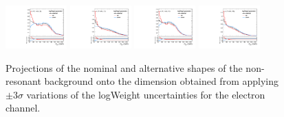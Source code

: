 \begin{figure}[htbp]
  \centering
  \includegraphics[width=0.21\textwidth]{fig/analysisAppendix/systs_nonRes_e_HP_nobb_LDy_logWeight_ProjY.pdf}
  \includegraphics[width=0.21\textwidth]{fig/analysisAppendix/systs_nonRes_e_LP_nobb_LDy_logWeight_ProjY.pdf}
  \includegraphics[width=0.21\textwidth]{fig/analysisAppendix/systs_nonRes_e_HP_nobb_HDy_logWeight_ProjY.pdf}
  \includegraphics[width=0.21\textwidth]{fig/analysisAppendix/systs_nonRes_e_LP_nobb_HDy_logWeight_ProjY.pdf}\\
  \caption{
    Projections of the nominal and alternative shapes of the non-resonant background onto the \MJ dimension obtained from applying $\pm3\sigma$ variations of the logWeight uncertainties for the electron channel.
  }
  \label{fig:systNonResMJ_logWeight}
\end{figure}

